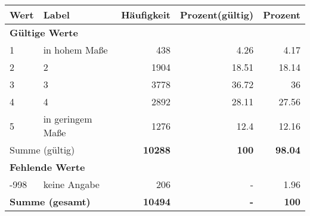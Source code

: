      \begin{longtable}{lXrrr}
     \toprule
     \textbf{Wert} & \textbf{Label} & \textbf{Häufigkeit} & \textbf{Prozent(gültig)} & \textbf{Prozent} \\
     \endhead
     \midrule
     \multicolumn{5}{l}{\textbf{Gültige Werte}}\\

     1 &
     \multicolumn{1}{X}{ in hohem Maße   } &


       \num{438} &
       \num[round-mode=places,round-precision=2]{4,26} &
         \num[round-mode=places,round-precision=2]{4,17} \\

     2 &
     \multicolumn{1}{X}{ 2   } &


       \num{1904} &
       \num[round-mode=places,round-precision=2]{18,51} &
         \num[round-mode=places,round-precision=2]{18,14} \\

     3 &
     \multicolumn{1}{X}{ 3   } &


       \num{3778} &
       \num[round-mode=places,round-precision=2]{36,72} &
         \num[round-mode=places,round-precision=2]{36} \\

     4 &
     \multicolumn{1}{X}{ 4   } &


       \num{2892} &
       \num[round-mode=places,round-precision=2]{28,11} &
         \num[round-mode=places,round-precision=2]{27,56} \\

     5 &
     \multicolumn{1}{X}{ in geringem Maße   } &


       \num{1276} &
       \num[round-mode=places,round-precision=2]{12,4} &
         \num[round-mode=places,round-precision=2]{12,16} \\
     \midrule
     \multicolumn{2}{l}{Summe (gültig)} &
       \textbf{\num{10288}} &
     \textbf{100} &
       \textbf{\num[round-mode=places,round-precision=2]{98,04}} \\
     \multicolumn{5}{l}{\textbf{Fehlende Werte}}\\
       -998 &
       keine Angabe &
         \num{206} &
        - &
         \num[round-mode=places,round-precision=2]{1,96} \\
     \midrule
     \multicolumn{2}{l}{\textbf{Summe (gesamt)}} &
          \textbf{\num{10494}} &
        \textbf{-} &
        \textbf{100} \\
     \bottomrule
     \end{longtable}
     
